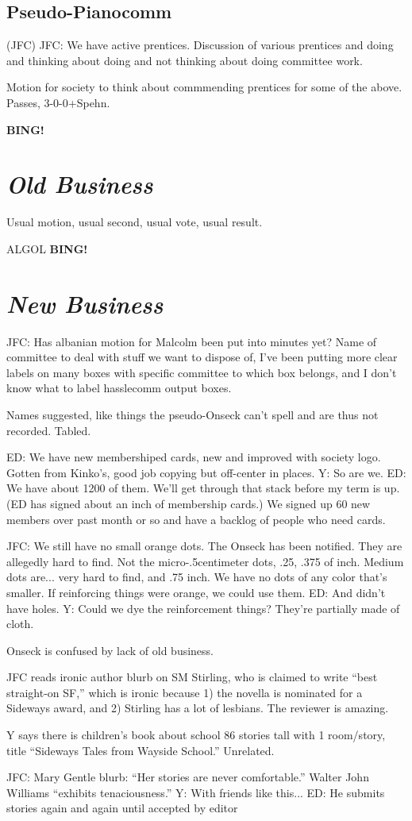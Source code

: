 \documentclass[10pt]{article}
\newcommand{\bing}{{\bf BING!} }
\newcommand{\goto}[1]{\bing \vskip 12pt \section*{{\em{#1}}}}
\begin{document}
\subsection*{Pseudo-Pianocomm}(JFC)
JFC: We have active prentices.  Discussion of various prentices and
doing and thinking about doing and not thinking about doing committee
work. 

Motion for society to think about commmending prentices for some of
the above.\\
Passes, 3-0-0+Spehn.

\goto{Old Business}
Usual motion, usual second, usual vote, usual result.

ALGOL
\goto{New Business}
JFC: Has albanian motion for Malcolm been put into minutes yet?  Name
of committee to deal with stuff we want to dispose of, I've been
putting more clear labels on many boxes with specific committee to
which box belongs, and I don't know what to label hasslecomm output
boxes.

Names suggested, like things the pseudo-Onseck can't spell and are
thus not recorded.  Tabled.

ED: We have new membershiped cards, new and improved with society
logo.  Gotten from Kinko's, good job copying but off-center in
places.  Y: So are we.  ED: We have about 1200 of them.  We'll get
through that stack before my term is up.  (ED has signed about an inch
of membership cards.)  We signed up 60 new members over past month or
so and have a backlog of people who need cards.

JFC: We still have no small orange dots.  The Onseck has been
notified.  They are allegedly hard to find.  Not the
micro-.5centimeter dots, .25, .375 of inch.  Medium dots are... very
hard to find, and .75 inch.  We have no dots of any color that's
smaller.  If reinforcing things were orange, we could use them.  ED:
And didn't have holes.  Y: Could we dye the reinforcement things?
They're partially made of cloth.

Onseck is confused by lack of old business.

JFC reads ironic author blurb on SM Stirling, who is claimed to write
``best straight-on SF,'' which is ironic because 1) the novella is
nominated for a Sideways award, and 2) Stirling has a lot of
lesbians.  The reviewer is amazing.

Y says there is children's book about school 86 stories tall with 1
room/story, title ``Sideways Tales from Wayside School.''  Unrelated.

JFC: Mary Gentle blurb: ``Her stories are never comfortable.''
Walter John Williams ``exhibits tenaciousness.''  Y: With friends like
this... ED: He submits stories again and again until accepted by
editor
\end{document}
